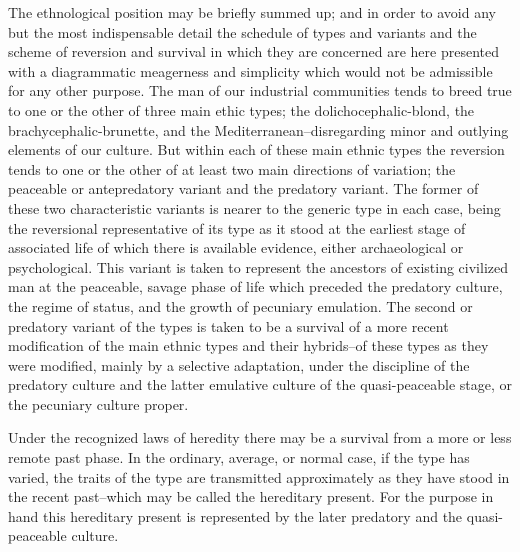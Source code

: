 \documentclass[12pt]{report}
\begin{document}
The ethnological position may be briefly summed up; and in order to
avoid any but the most indispensable detail the schedule of types and
variants and the scheme of reversion and survival in which they
are concerned are here presented with a diagrammatic meagerness and
simplicity which would not be admissible for any other purpose. The man
of our industrial communities tends to breed true to one or the other
of three main ethic types; the dolichocephalic-blond, the
brachycephalic-brunette, and the Mediterranean--disregarding minor and
outlying elements of our culture. But within each of these main ethnic
types the reversion tends to one or the other of at least two main
directions of variation; the peaceable or antepredatory variant and the
predatory variant. The former of these two characteristic variants
is nearer to the generic type in each case, being the reversional
representative of its type as it stood at the earliest stage
of associated life of which there is available evidence, either
archaeological or psychological. This variant is taken to represent the
ancestors of existing civilized man at the peaceable, savage phase of
life which preceded the predatory culture, the regime of status, and the
growth of pecuniary emulation. The second or predatory variant of the
types is taken to be a survival of a more recent modification of
the main ethnic types and their hybrids--of these types as they were
modified, mainly by a selective adaptation, under the discipline of
the predatory culture and the latter emulative culture of the
quasi-peaceable stage, or the pecuniary culture proper.

Under the recognized laws of heredity there may be a survival from a
more or less remote past phase. In the ordinary, average, or normal
case, if the type has varied, the traits of the type are transmitted
approximately as they have stood in the recent past--which may be called
the hereditary present. For the purpose in hand this hereditary present
is represented by the later predatory and the quasi-peaceable culture.
\end{document}

